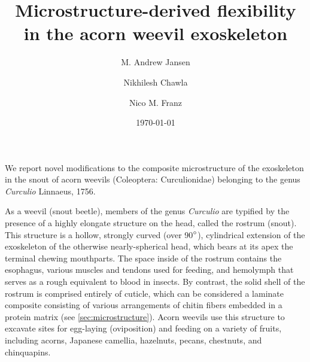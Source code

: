 \documentclass[twocolumn, linenumbers, superscriptaddress]{revtex4-1}
\begin{document}
	\begin{abstract}
		\blindtext
	\end{abstract}
	
	{\title{Microstructure-derived flexibility in the acorn weevil exoskeleton}
	
	\date{\today}
	
	\author{M. Andrew Jansen}
	\author{Nikhilesh Chawla}
	\author{Nico M. Franz}
		
	\maketitle
	}
	
	
	We report novel modifications to the composite microstructure of the exoskeleton in the snout of acorn weevils (Coleoptera: Curculionidae) belonging to the genus \textit{Curculio} Linnaeus, 1756.

	As a weevil (snout beetle), members of the genus \textit{Curculio} are typified by the presence of a highly elongate structure on the head, called the rostrum (snout). 
	This structure is a hollow, strongly curved (over 90$\degree$), cylindrical extension of the exoskeleton of the otherwise nearly-spherical head, which bears at its apex the terminal chewing mouthparts. 
	The space inside of the rostrum contains the esophagus, various muscles and tendons used for feeding, and hemolymph that serves as a rough equivalent to blood in insects.
	By contrast, the solid shell of the rostrum is comprised entirely of cuticle, which can be considered a laminate composite consisting of various arrangements of chitin fibers embedded in a protein matrix (see \cref{sec:microstructure}).
	Acorn weevils use this structure to excavate sites for egg-laying (oviposition) and feeding on a variety of fruits, including acorns, Japanese camellia, hazelnuts, pecans, chestnuts, and chinquapins. 
		
\end{document}
